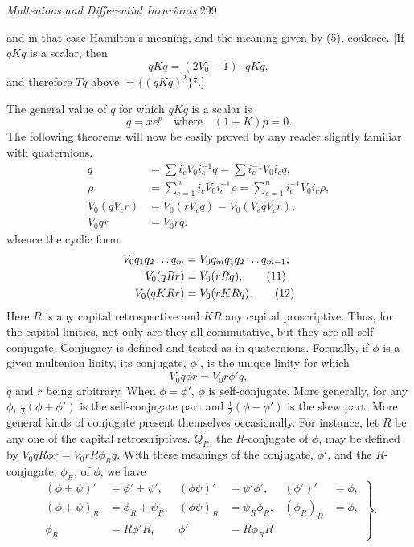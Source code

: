 \documentclass[11pt]{article}
\begin{document}
\newpage\thispagestyle{empty}
\begin{center}\textit{Multenions and Differential Invariants.}\hfill 299\end{center}
and in that case Hamilton's meaning, and the meaning given by (5), coalesce. [If $qKq$ is a scalar, then
\begin{equation}qKq=(2V_0-1)\cdot qKq,\end{equation}
and therefore $Tq$ above $=\{(qKq)^2\}^{\frac14}$.]

\indent The general value of $q$ for which $qKq$ is a scalar is
\begin{equation}q=xe^p\quad\text{where}\quad(1+K)p=0.\tag{6}\end{equation}
The following theorems will now be easily proved by any reader slightly familiar with quaternions.
\begin{align}q&=\sum i_cV_0i_c^{-1}q=\sum i_c^{-1}V_0i_cq,\tag{7}\\ \rho&=\sum_{c=1}^ni_cV_0i_c^{-1}\rho=\sum_{c=1}^ni_c^{-1}V_0i_c\rho,\tag{8}\\V_0(qV_cr)&=V_0(rV_cq)=V_0(V_cqV_cr),\tag{9}\\V_0qr&=V_0rq.\tag{10}\end{align}
whence the cyclic form
\begin{align}V_0q_1q_2\ldots q_m&=V_0q_mq_1q_2\ldots q_{m-1},\notag\\V_0(qRr)&=V_0(rRq),\tag{11}\\V_0(qKRr)&=V_0(rKRq).\tag{12}\end{align}
Here $R$ is any capital retrospective and $KR$ any capital proscriptive. Thus, for the capital linities, not only are they all commutative, but they are all self-conjugate. Conjugacy is defined and tested as in quaternions. Formally, if $\phi$ is a given multenion linity, its conjugate, $\phi'$, is the unique linity for which
\begin{equation}V_0q\phi r=V_0r\phi' q,\tag{13}\end{equation}
$q$ and $r$ being arbitrary. When $\phi=\phi'$, $\phi$ is self-conjugate. More generally, for any $\phi$, $\tfrac12(\phi+\phi')$ is the self-conjugate part and $\tfrac12(\phi-\phi')$ is the skew part. More general kinds of conjugate present themselves occasionally. For instance, let $R$ be any one of the capital retroscriptives. $Q_R$, the $R$-conjugate of $\phi$, may be defined by $V_0qR\phi r=V_0rR\phi_Rq$. With these meanings of the conjugate, $\phi'$, and the $R$-conjugate, $\phi_R$, of $\phi$, we have
\begin{equation}\left.\begin{aligned}(\phi+\psi)'&=\phi'+\psi',&(\phi\psi)'&=\psi'\phi',&(\phi')'&=\phi,\\(\phi+\psi)_R&=\phi_R+\psi_R,&(\phi\psi)_R&=\psi_R\phi_R,&(\phi_R)_R&=\phi,\\\phi_R&=R\phi'R,&\phi'&=R\phi_RR\end{aligned}\right\}.\tag{14}\end{equation}
\end{document}
